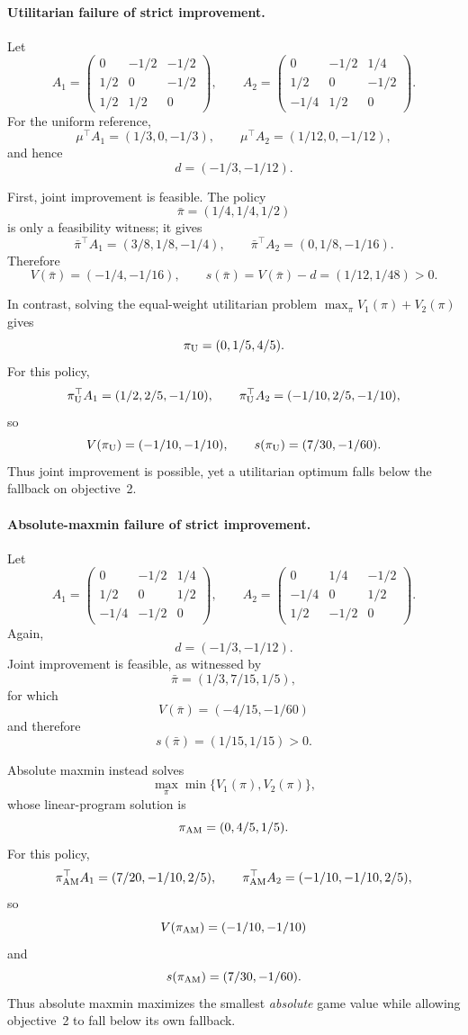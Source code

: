 \documentclass{article}
\theoremstyle{remark}
\theoremstyle{plain}
\begin{document}
\paragraph{Utilitarian failure of strict improvement.}
Let
\[
A_1=
\begin{pmatrix}
0&-1/2&-1/2\\
1/2&0&-1/2\\
1/2&1/2&0
\end{pmatrix},
\qquad
A_2=
\begin{pmatrix}
0&-1/2&1/4\\
1/2&0&-1/2\\
-1/4&1/2&0
\end{pmatrix}.
\]
For the uniform reference,
\[
\mu^\top A_1=(1/3,0,-1/3),
\qquad
\mu^\top A_2=(1/12,0,-1/12),
\]
and hence
\[
d=(-1/3,-1/12).
\]

First, joint improvement is feasible. The policy
\[
\bar\pi=(1/4,1/4,1/2)
\]
is only a feasibility witness; it gives
\[
\bar\pi^\top A_1=(3/8,1/8,-1/4),
\qquad
\bar\pi^\top A_2=(0,1/8,-1/16).
\]
Therefore
\[
V(\bar\pi)=(-1/4,-1/16),
\qquad
s(\bar\pi)
=
V(\bar\pi)-d
=
(1/12,1/48)>0.
\]

In contrast, solving the equal-weight utilitarian problem
$\max_\pi V_1(\pi)+V_2(\pi)$ gives
\[
\pi_{\rm U}=(0,1/5,4/5).
\]
For this policy,
\[
\pi_{\rm U}^\top A_1=(1/2,2/5,-1/10),
\qquad
\pi_{\rm U}^\top A_2=(-1/10,2/5,-1/10),
\]
so
\[
V(\pi_{\rm U})=(-1/10,-1/10),
\qquad
s(\pi_{\rm U})
=
(7/30,-1/60).
\]
Thus joint improvement is possible, yet a utilitarian optimum falls
below the fallback on objective~2.

\paragraph{Absolute-maxmin failure of strict improvement.}
Let
\[
A_1=
\begin{pmatrix}
0&-1/2&1/4\\
1/2&0&1/2\\
-1/4&-1/2&0
\end{pmatrix},
\qquad
A_2=
\begin{pmatrix}
0&1/4&-1/2\\
-1/4&0&1/2\\
1/2&-1/2&0
\end{pmatrix}.
\]
Again,
\[
d=(-1/3,-1/12).
\]
Joint improvement is feasible, as witnessed by
\[
\bar\pi=(1/3,7/15,1/5),
\]
for which
\[
V(\bar\pi)=(-4/15,-1/60)
\]
and therefore
\[
s(\bar\pi)=(1/15,1/15)>0.
\]

Absolute maxmin instead solves
\[
\max_{\pi}\min\{V_1(\pi),V_2(\pi)\},
\]
whose linear-program solution is
\[
\pi_{\rm AM}=(0,4/5,1/5).
\]
For this policy,
\[
\pi_{\rm AM}^\top A_1=(7/20,-1/10,2/5),
\qquad
\pi_{\rm AM}^\top A_2=(-1/10,-1/10,2/5),
\]
so
\[
V(\pi_{\rm AM})=(-1/10,-1/10)
\]
and
\[
s(\pi_{\rm AM})
=
(7/30,-1/60).
\]
Thus absolute maxmin maximizes the smallest \emph{absolute} game value
while allowing objective~2 to fall below its own fallback.
\end{document}
